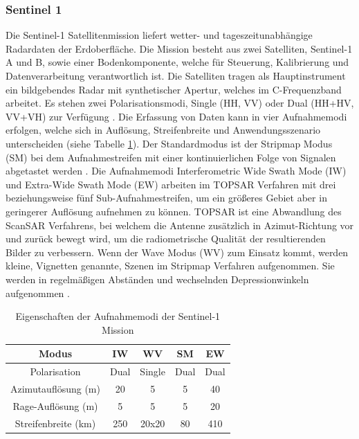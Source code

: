 \subsubsection{Sentinel 1}
Die Sentinel-1 Satellitenmission liefert wetter- und tageszeitunabhängige Radardaten der Erdoberfläche. Die Mission besteht aus zwei Satelliten, Sentinel-1 A und B,
sowie einer Bodenkomponente, welche für Steuerung, Kalibrierung und Datenverarbeitung verantwortlich ist. Die Satelliten tragen als Hauptinstrument ein 
bildgebendes Radar mit synthetischer Apertur, welches im C-Frequenzband arbeitet. Es stehen zwei Polarisationsmodi, Single (HH, VV) oder Dual (HH+HV, VV+VH)
zur Verfügung \cite{sentinel_1_definition}. 
Die Erfassung von Daten kann in vier Aufnahmemodi erfolgen, welche sich in Auflösung, Streifenbreite und Anwendungsszenario unterscheiden (siehe Tabelle \ref{aufnahmemodi_sentinel_1}). 
Der Standardmodus ist der Stripmap Modus (SM) bei dem Aufnahmestreifen mit einer kontinuierlichen Folge von Signalen abgetastet werden \cite{sentinel_1_definition}.
Die Aufnahmemodi Interferometric Wide Swath Mode (IW) und Extra-Wide Swath Mode (EW) arbeiten im TOPSAR Verfahren mit drei beziehungsweise
fünf Sub-Aufnahmestreifen, um ein größeres Gebiet aber in geringerer Auflösung aufnehmen zu können. TOPSAR ist eine Abwandlung 
des ScanSAR Verfahrens, bei welchem die Antenne zusätzlich in Azimut-Richtung vor und zurück bewegt wird, um die radiometrische Qualität der resultierenden Bilder zu verbessern. 
Wenn der Wave Modus (WV) zum Einsatz kommt, werden kleine, Vignetten genannte, Szenen im Stripmap Verfahren aufgenommen. Sie werden in regelmäßigen Abständen und
wechselnden Depressionwinkeln aufgenommen \cite{tutorial_on_sar}\cite{sentinel_1_definition}.   

\begin{center}
\begin{table}[H]
    \caption{Eigenschaften der Aufnahmemodi der Sentinel-1 Mission \cite{sentinel_1_overview}}
    \centering
    \begin{tabular}{c|c c c c } 
        Modus & IW & WV & SM & EW \\ 
        \hline
        Polarisation & Dual & Single & Dual & Dual \\ 
        Azimutauflösung (m) & 20 & 5 & 5 & 40 \\
        Rage-Auflösung (m) & 5 & 5 & 5 & 20 \\
        Streifenbreite (km) & 250 & 20x20 & 80 & 410\\
    \end{tabular}
    \label{aufnahmemodi_sentinel_1}
\end{table}
\end{center}

